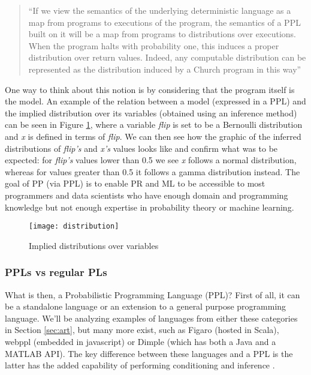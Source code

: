 \begin{quote}
  ``If we view the semantics of the underlying deterministic language as a map
  from programs to executions of the program, the semantics of a PPL built on it
   will be a map from programs to distributions over executions. When the
   program halts with probability one, this induces a proper distribution over
   return values. Indeed, any computable distribution can be represented as the
   distribution induced by a Church program in this way''~\cite{Freer2012}
\end{quote}

One way to think about this notion is by considering that the program itself
is the model. An example of the relation between a model (expressed in a PPL)
and the implied distribution over its variables (obtained using an inference
method) can be seen in Figure \ref{fig:distribution}, where a variable \textit{flip}
is set to be a Bernoulli distribution and \textit{x} is defined in terms of
\textit{flip}. We can then see how the graphic of the inferred distributions
of \textit{flip's} and \textit{x's} values looks like and confirm what was to
be expected: for \textit{flip's} values lower than 0.5 we see \textit{x} follows
a normal distribution, whereas for values greater than 0.5 it follows a gamma
distribution instead.
 The goal of PP (via PPL) is to enable PR and ML to be accessible to
most programmers and data scientists who have enough domain and programming
knowledge but not enough expertise in probability theory or machine learning.

\begin{figure}[t]
  \begin{center}
    \leavevmode
    \texttt{[image: distribution]}
    \caption{Implied distributions over variables \cite{intpp}}
    \label{fig:distribution}
  \end{center}
\end{figure}

\subsubsection{PPLs vs regular PLs}

What is then, a Probabilistic Programming Language (PPL)? First of all, it can
be a standalone language or an extension to a general purpose programming language.
We'll be analyzing examples of languages from either these categories in Section
\ref{sec:art}, but many more exist, such as Figaro \cite{figaro} (hosted in Scala),
webppl \cite{dippl} (embedded in javascript) or Dimple
\cite{DBLP:journals/corr/abs-1212-2991} (which has both a Java and a MATLAB API).
The key difference between these languages and a PPL is the latter has
the added capability of performing conditioning and inference \cite{Andrieu2003}.

